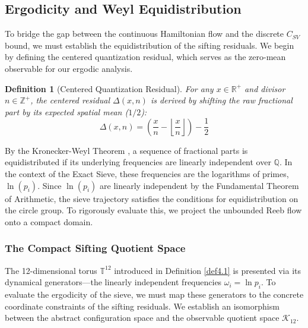 \documentclass[sn-mathphys-num, pdflatex]{sn-jnl}
\newtheorem{definition}[theorem]{Definition}
\begin{document}
\subsection{Ergodicity and Weyl Equidistribution}

To bridge the gap between the continuous Hamiltonian flow and the discrete $C_{SV}$ bound, we must establish the equidistribution of the sifting residuals. We begin by defining the centered quantization residual, which serves as the zero-mean observable for our ergodic analysis.

\begin{definition}[Centered Quantization Residual]
For any $x \in \mathbb{R}^+$ and divisor $n \in \mathbb{Z}^+$, the centered residual $\Delta(x, n)$ is derived by shifting the raw fractional part by its expected spatial mean ($1/2$):
\begin{equation}
\Delta(x, n) = \left( \frac{x}{n} - \left\lfloor \frac{x}{n} \right\rfloor \right) - \frac{1}{2}
\label{eq:centered_delta}
\end{equation}
\end{definition}

By the Kronecker-Weyl Theorem \cite{weyl}, a sequence of fractional parts is equidistributed if its underlying frequencies are linearly independent over $\mathbb{Q}$. In the context of the Exact Sieve, these frequencies are the logarithms of primes, $\ln(p_i)$. Since $\ln(p_i)$ are linearly independent by the Fundamental Theorem of Arithmetic, the sieve trajectory satisfies the conditions for equidistribution on the circle group. To rigorously evaluate this, we project the unbounded Reeb flow onto a compact domain.

\subsubsection{The Compact Sifting Quotient Space}
\label{def:quotient_space}

The 12-dimensional torus $\mathbb{T}^{12}$ introduced in Definition \ref{def4.1} is presented via its dynamical generators—the linearly independent frequencies $\omega_i = \ln p_i$. To evaluate the ergodicity of the sieve, we must map these generators to the concrete coordinate constraints of the sifting residuals. We establish an isomorphism between the abstract configuration space and the observable quotient space $\mathcal{K}_{12}$.
\end{document}
